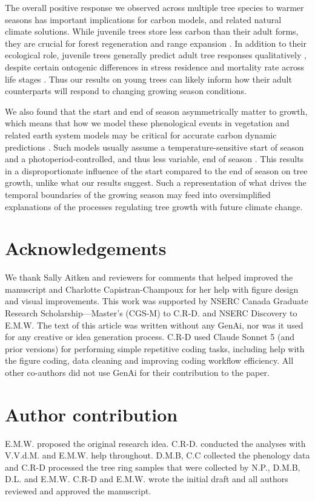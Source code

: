 \documentclass{article}\usepackage[]{graphicx}\usepackage[]{xcolor}
\begin{document}
The overall positive response we observed across multiple tree species to warmer seasons has important implications for carbon models, and related natural climate solutions. While juvenile trees store less carbon than their adult forms, they are crucial for forest regeneration and range expansion \citep[as discussed above, and see][]{luu_importance_2024}. In addition to their ecological role, juvenile trees generally predict adult tree responses qualitatively \citep{augspurger_differences_2003,wolkovich_why_2025}, despite certain ontogenic differences in stress residence and mortality rate across life stages \citep{caron_thermal_2021}. Thus our results on young trees can likely inform how their adult counterparts will respond to changing growing season conditions.

We also found that the start and end of season asymmetrically matter to growth, which means that how we model these phenological events in vegetation and related earth system models may be critical for accurate carbon dynamic predictions \citep{li_comparison_2022}. Such models usually assume a temperature-sensitive start of season and a photoperiod-controlled, and thus less variable, end of season \citep{chen_comparison_2022,melaas_multiscale_2016}. This results in a disproportionate influence of the start compared to the end of season on tree growth, unlike what our results suggest. Such a representation of what drives the temporal boundaries of the growing season may feed into oversimplified explanations of the processes regulating tree growth with future climate change. 

\section*{Acknowledgements}
We thank Sally Aitken and reviewers for comments that helped improved the manuscript and Charlotte Capistran-Champoux for her help with figure design and visual improvements. This work was supported by NSERC Canada Graduate Research Scholarship---Master’s (CGS-M) to C.R-D. and NSERC Discovery to E.M.W. The text of this article was written without any GenAi, nor was it used for any creative or idea generation process. C.R-D used Claude Sonnet 5 (and prior versions) for performing simple repetitive coding tasks, including help with the figure coding, data cleaning and improving coding workflow efficiency. All other co-authors did not use GenAi for their contribution to the paper.

\section*{Author contribution}
E.M.W. proposed the original research idea. C.R-D. conducted the analyses with V.V.d.M. and E.M.W. help throughout. D.M.B, C.C collected the phenology data and C.R-D processed the tree ring samples that were collected by N.P., D.M.B, D.L. and E.M.W. C.R-D and E.M.W. wrote the initial draft and all authors reviewed and approved the manuscript.
\end{document}
